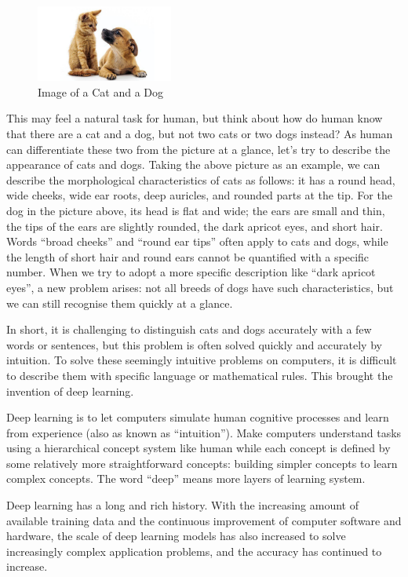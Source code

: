 \begin{figure}[h!]
\centering
\includegraphics[width=0.4\textwidth]{catanddog.pdf}
\caption{Image of a Cat and a Dog}
\label{fig:catanddog}
\end{figure}

This may feel a natural task for human, but think about how do human know that there are a cat and a dog, but not two cats or two dogs instead? As human can differentiate these two from the picture at a glance, let's try to describe the appearance of cats and dogs. Taking the above picture as an example, we can describe the morphological characteristics of cats as follows: it has a round head, wide cheeks, wide ear roots, deep auricles, and rounded parts at the tip. For the dog in the picture above, its head is flat and wide; the ears are small and thin, the tips of the ears are slightly rounded, the dark apricot eyes, and short hair. Words ``broad cheeks'' and ``round ear tips'' often apply to cats and dogs, while the length of short hair and round ears cannot be quantified with a specific number. When we try to adopt a more specific description like ``dark apricot eyes'', a new problem arises: not all breeds of dogs have such characteristics, but we can still recognise them quickly at a glance.

In short, it is challenging to distinguish cats and dogs accurately with a few words or sentences, but this problem is often solved quickly and accurately by intuition. To solve these seemingly intuitive problems on computers, it is difficult to describe them with specific language or mathematical rules. This brought the invention of deep learning.

Deep learning is to let computers simulate human cognitive processes and learn from experience (also as known as ``intuition''). Make computers understand tasks using a hierarchical concept system like human while each concept is defined by some relatively more straightforward concepts: building simpler concepts to learn complex concepts. The word ``deep'' means more layers of learning system. 

Deep learning has a long and rich history. With the increasing amount of available training data and the continuous improvement of computer software and hardware, the scale of deep learning models has also increased to solve increasingly complex application problems, and the accuracy has continued to increase.



